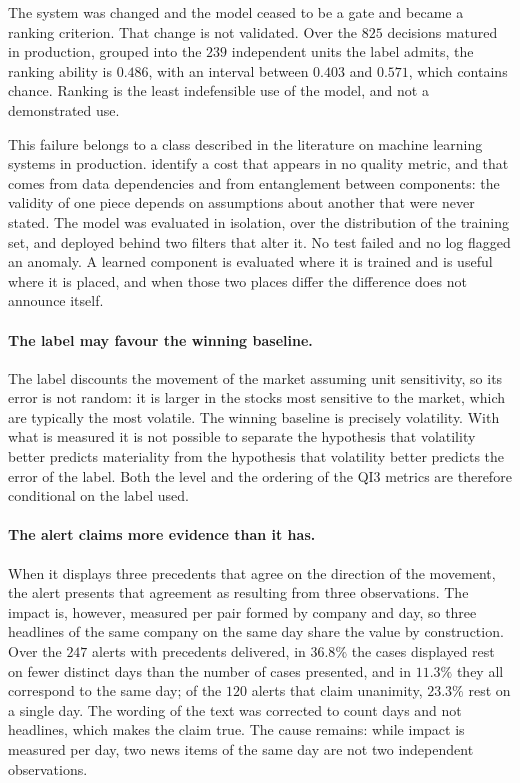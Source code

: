 The system was changed and the model ceased to be a gate and became a ranking criterion. That
change is not validated. Over the $825$ decisions matured in production, grouped into the $239$
independent units the label admits, the ranking ability is $0.486$, with an interval between $0.403$
and $0.571$, which contains chance. Ranking is the least indefensible use of the model, and not a
demonstrated use.

This failure belongs to a class described in the literature on machine learning systems in
production. \textcite{sculley2015debt} identify a cost that appears in no quality metric, and that
comes from data dependencies and from entanglement between components: the validity of one piece
depends on assumptions about another that were never stated. The model was evaluated in isolation,
over the distribution of the training set, and deployed behind two filters that alter it. No test
failed and no log flagged an anomaly. A learned component is evaluated where it is trained and is
useful where it is placed, and when those two places differ the difference does not announce
itself.

\paragraph{The label may favour the winning baseline.}
The label discounts the movement of the market assuming unit sensitivity, so its error is not
random: it is larger in the stocks most sensitive to the market, which are typically the most
volatile. The winning baseline is precisely volatility. With what is measured it is not possible to
separate the hypothesis that volatility better predicts materiality from the hypothesis that
volatility better predicts the error of the label. Both the level and the ordering of the
\gls{QI}3 metrics are therefore conditional on the label used.

\paragraph{The alert claims more evidence than it has.}
When it displays three precedents that agree on the direction of the movement, the alert presents
that agreement as resulting from three observations. The impact is, however, measured per pair
formed by company and day, so three headlines of the same company on the same day share the value
by construction. Over the $247$ alerts with precedents delivered, in $36.8\%$ the cases displayed
rest on fewer distinct days than the number of cases presented, and in $11.3\%$ they all
correspond to the same
day; of the $120$ alerts that claim unanimity, $23.3\%$ rest on a single day. The wording of the
text was corrected to count days and not headlines, which makes the claim true. The cause remains:
while impact is measured per day, two news items of the same day are not two independent
observations.

